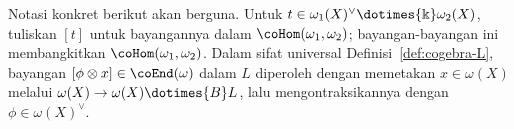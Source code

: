 \begin{convention}\label{con:coend-bracket}
	Notasi konkret berikut akan berguna. Untuk
	$t\in\omega_1(X)^\vee\dotimes{\Bbbk}\omega_2(X)$, tuliskan $[t]$ untuk
	bayangannya dalam $\coHom(\omega_1,\omega_2)$; bayangan-bayangan ini
	membangkitkan $\coHom(\omega_1,\omega_2)$. Dalam sifat universal
	Definisi~\ref{def:cogebra-L}, bayangan
	$[\phi\otimes x]\in\coEnd(\omega)$ dalam $L$ diperoleh dengan
	memetakan $x\in\omega(X)$ melalui
	$\omega(X)\to\omega(X)\dotimes{B}L$, lalu mengontraksikannya dengan
	$\phi\in\omega(X)^\vee$.
\end{convention}
